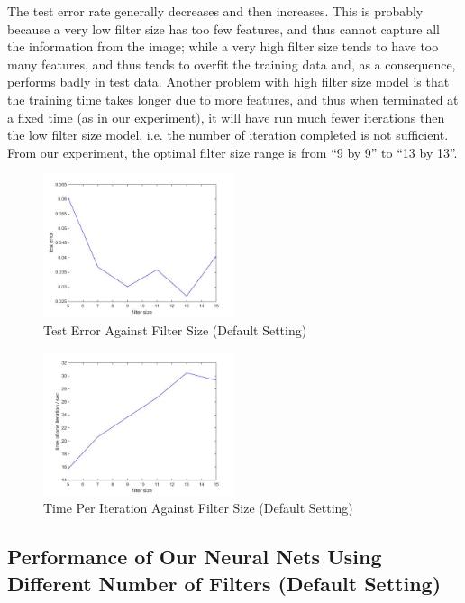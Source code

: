 \documentclass[10pt,twocolumn]{article}
\begin{document}
The test error rate generally decreases and then increases. This is probably because a very low filter size has too few features, and thus cannot capture all the information from the image; while a very high filter size tends to have too many features, and thus tends to overfit the training data and, as a consequence, performs badly in test data. Another problem with high filter size model is that the training time takes longer due to more features, and thus when terminated at a fixed time (as in our experiment), it will have run much fewer iterations then the low filter size model, i.e. the number of iteration completed is not sufficient. From our experiment, the optimal filter size range is from ``9 by 9'' to ``13 by 13''.

\begin{figure}
\includegraphics[width = 0.5\textwidth]{figure/test_error_vs_filter_size}
\caption{Test Error Against Filter Size (Default Setting)}
\label{fig:test_error_vs_filter_size}
\end{figure}

\begin{figure}
\includegraphics[width = 0.5\textwidth]{figure/iter_time_vs_filter_size}
\caption{Time Per Iteration Against Filter Size (Default Setting)}
\label{fig:iter_time_vs_filter_size}
\end{figure}

\subsection{Performance of Our Neural Nets Using Different Number of Filters (Default Setting)}
\end{document}
